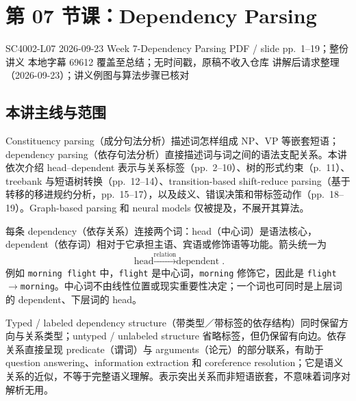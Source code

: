 
\section{第 07 节课：Dependency Parsing}
\label{lecture:SC4002-L07}

\lecturemeta
  {SC4002-L07}
  {2026-09-23}
  {Week 7-Dependency Parsing}
  {PDF / slide pp.~1--19；整份讲义}
  {本地字幕 69612 覆盖至总结；无时间戳，原稿不收入仓库}
  {讲解后请求整理（2026-09-23）；讲义例图与算法步骤已核对}

\subsection{本讲主线与范围}

Constituency parsing（成分句法分析）描述词怎样组成 NP、VP 等嵌套短语；dependency parsing（依存句法分析）直接描述词与词之间的语法支配关系。本讲依次介绍 head--dependent 表示与关系标签（pp.~2--10）、树的形式约束（p.~11）、treebank 与短语树转换（pp.~12--14）、transition-based shift-reduce parsing（基于转移的移进规约分析，pp.~15--17），以及歧义、错误决策和带标签动作（pp.~18--19）。Graph-based parsing 和 neural models 仅被提及，不展开其算法。


每条 dependency（依存关系）连接两个词：head（中心词）是语法核心，dependent（依存词）相对于它承担主语、宾语或修饰语等功能。箭头统一为
\[
  \boxed{\text{head}\xrightarrow{\text{relation}}\text{dependent}}.
\]
例如 \texttt{morning flight} 中，\texttt{flight} 是中心词，\texttt{morning} 修饰它，因此是 \texttt{flight}$\rightarrow$\texttt{morning}。中心词不由线性位置或现实重要性决定；一个词也可同时是上层词的 dependent、下层词的 head。

Typed / labeled dependency structure（带类型／带标签的依存结构）同时保留方向与关系类型；untyped / unlabeled structure 省略标签，但仍保留有向边。依存关系直接呈现 predicate（谓词）与 arguments（论元）的部分联系，有助于 question answering、information extraction 和 coreference resolution；它是语义关系的近似，不等于完整语义理解。表示突出关系而非短语嵌套，不意味着词序对解析无用。

